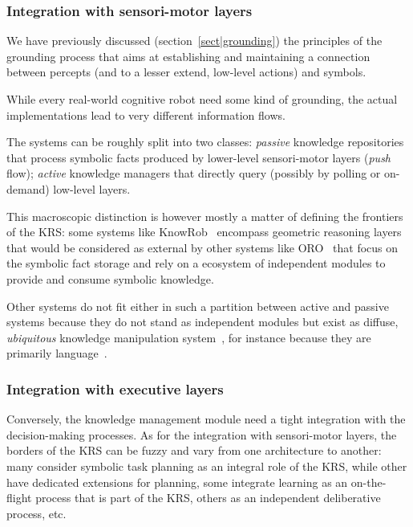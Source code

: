 \documentclass[a4paper, twocolumn]{article}
\begin{document}
\subsubsection{Integration with sensori-motor layers}
\label{sect|integration-sensorimotor}

We have previously discussed (section~\ref{sect|grounding}) the principles of
the grounding process that aims at establishing and maintaining a connection
between percepts (and to a lesser extend, low-level actions) and symbols.

While every real-world cognitive robot need some kind of grounding, the actual
implementations lead to very different information flows.

The systems can be roughly split into two classes: \emph{passive} knowledge
repositories that process symbolic facts produced by lower-level sensori-motor
layers (\emph{push} flow); \emph{active} knowledge managers that directly query
(possibly by polling or on-demand) low-level layers.

This macroscopic distinction is however mostly a matter of defining the
frontiers of the KRS: some systems like KnowRob~\cite{Tenorth2009a} encompass
geometric reasoning layers that would be considered as external by other
systems like ORO~\cite{Lemaignan2010} that focus on the symbolic fact storage
and rely on a ecosystem of independent modules to provide and consume symbolic
knowledge.


Other systems do not fit either in such a partition between active and passive
systems because they do not stand as independent modules but exist as diffuse,
\emph{ubiquitous} knowledge manipulation system~\cite{Jacobsson2008}, for
instance because they are primarily language~\cite{Ferrein2008, Sabri2011}.

\subsubsection{Integration with executive layers}
\label{sect|integration-executive-layers}

Conversely, the knowledge management module need a tight integration with the
decision-making processes. As for the integration with sensori-motor
layers, the borders of the KRS can be fuzzy and vary from one architecture to
another: many consider symbolic task planning as an integral role of the KRS,
while other have dedicated extensions for planning, some integrate learning as
an on-the-flight process that is part of the KRS, others as an independent
deliberative process, etc.
\end{document}

